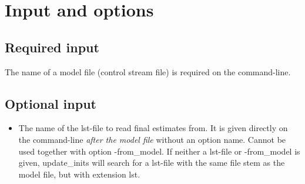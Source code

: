 \section{Input and options}

\subsection{Required input}
The name of a model file (control stream file) is required on the command-line.

\subsection{Optional input}
\begin{itemize}
\item The name of the lst-file to read final estimates from. It is given directly on 
the command-line \emph{after the model file} without an option name.
Cannot be used together with option -from\_model. 
If neither a lst-file or -from\_model is given, 
update\_inits will search for a lst-file with the same file stem as the model file, 
but with extension lst.
\end{itemize}
